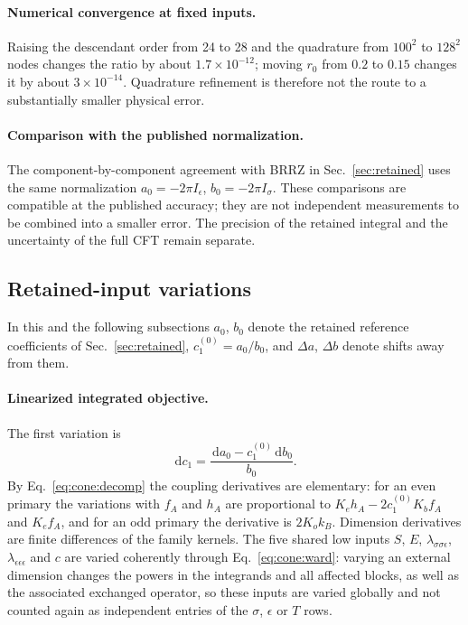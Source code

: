 \documentclass[11pt,a4paper]{article}
\numberwithin{equation}{section}
\newcommand{\dd}{\,\mathrm d}
\newcommand{\sci}[2]{#1\times10^{#2}}
\begin{document}
\paragraph{Numerical convergence at fixed inputs.} Raising the descendant order from 24 to 28 and the quadrature from
$100^2$ to $128^2$ nodes changes the ratio by about $\sci{1.7}{-12}$; moving $r_0$ from $0.2$ to $0.15$ changes it by
about $\sci{3}{-14}$. Quadrature refinement is therefore not the route to a substantially smaller physical error.

\paragraph{Comparison with the published normalization.} The component-by-component agreement with BRRZ in
Sec.~\ref{sec:retained} uses the same normalization $a_0=-2\pi I_\epsilon$, $b_0=-2\pi I_\sigma$. These comparisons
are compatible at the published accuracy; they are not independent measurements to be combined into a smaller error.
The precision of the retained integral and the uncertainty of the full CFT remain separate.

\subsection{Retained-input variations}\label{app:cone:variations}
In this and the following subsections $a_0$, $b_0$ denote the retained reference coefficients of
Sec.~\ref{sec:retained}, $c_1^{(0)}=a_0/b_0$, and $\Delta a$, $\Delta b$ denote shifts away from them.

\paragraph{Linearized integrated objective.} The first variation is
\begin{equation}
 \dd c_1=\frac{\dd a_0-c_1^{(0)}\dd b_0}{b_0}.
 \label{eq:cone:variation}
\end{equation}
By Eq.~\eqref{eq:cone:decomp} the coupling derivatives are elementary: for an even primary the variations with $f_A$
and $h_A$ are proportional to $K_eh_A-2c_1^{(0)}K_bf_A$ and $K_ef_A$, and for an odd primary the derivative is
$2K_ok_B$. Dimension derivatives are finite differences of the family kernels. The five shared low inputs $S$, $E$,
$\lambda_{\sigma\sigma\epsilon}$, $\lambda_{\epsilon\epsilon\epsilon}$ and $c$ are varied coherently through
Eq.~\eqref{eq:cone:ward}: varying an external dimension changes the powers in the integrands and all affected blocks,
as well as the associated exchanged operator, so these inputs are varied globally and not counted again as independent
entries of the $\sigma$, $\epsilon$ or $T$ rows.
\end{document}
